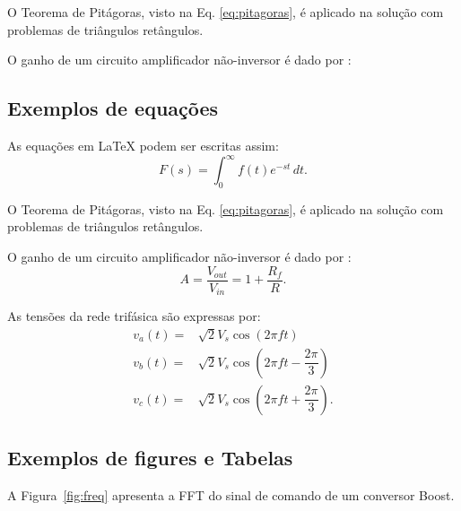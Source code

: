 \documentclass{article}
\begin{document}
O Teorema de Pitágoras, visto na Eq. \eqref{eq:pitagoras}, é aplicado na solução com problemas de triângulos retângulos.

O ganho de um circuito amplificador não-inversor é dado por \cite{ApostilaAldo}:

\subsection{Exemplos de equações}

As equações em LaTeX podem ser escritas assim:
\begin{equation}
    F(s) = \int_0^\infty f(t) e^{-st} \,dt. \label{eq:pitagoras}
\end{equation}


O Teorema de Pitágoras, visto na Eq. \linebreak \eqref{eq:pitagoras}, é aplicado na solução com problemas de triângulos retângulos.

O ganho de um circuito amplificador não-inversor é dado por \cite{ApostilaAldo}: %
\begin{equation}
    A = \dfrac{V_{out}}{V_{in}} = 1+\dfrac{R_f}{R}.
\end{equation}

As tensões da rede trifásica são expressas por:
\begin{align}
    v_a(t) = & \sqrt{2} V_s\cos(2\pi f t) \\
    v_b(t) = & \sqrt{2} V_s\cos\left(2\pi f t - \dfrac{2\pi}{3}\right) \\
    v_c(t) = & \sqrt{2} V_s\cos\left(2\pi f t + \dfrac{2\pi}{3}\right).
\end{align}

\subsection{Exemplos de figures e Tabelas}

A Figura~\ref{fig:freq} apresenta a FFT do sinal de comando de um conversor Boost.
\end{document}
